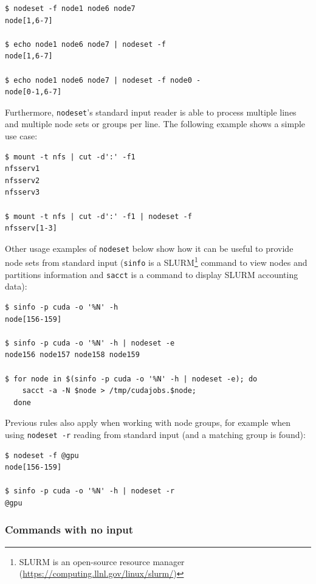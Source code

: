 \documentclass[english,a4paper]{csuserguide}
\newcommand{\nodeset}{\texttt{nodeset}\xspace}
\begin{document}
\begin{lstlisting}[breaklines=true, breakatwhitespace=true] 
$ nodeset -f node1 node6 node7
node[1,6-7]

$ echo node1 node6 node7 | nodeset -f
node[1,6-7]

$ echo node1 node6 node7 | nodeset -f node0 -
node[0-1,6-7]
\end{lstlisting}

\label{nodeset-stdin}
Furthermore, \nodeset's standard input reader is able to process multiple lines and multiple node sets or groups per line. The following example shows a simple use case:
\bigskip

\begin{lstlisting}[breaklines=true, breakatwhitespace=true] 
$ mount -t nfs | cut -d':' -f1
nfsserv1
nfsserv2
nfsserv3

$ mount -t nfs | cut -d':' -f1 | nodeset -f
nfsserv[1-3]
\end{lstlisting}


Other usage examples of \nodeset below show how it can be useful to provide node sets from standard input (\verb+sinfo+ is a SLURM\footnote{SLURM is an open-source resource manager (\url{https://computing.llnl.gov/linux/slurm/})} command to view nodes and partitions information and \verb+sacct+ is a command to display SLURM accounting data):
\bigskip

\begin{lstlisting}[breaklines=true, breakatwhitespace=true] 
$ sinfo -p cuda -o '%N' -h
node[156-159]

$ sinfo -p cuda -o '%N' -h | nodeset -e
node156 node157 node158 node159

$ for node in $(sinfo -p cuda -o '%N' -h | nodeset -e); do
	sacct -a -N $node > /tmp/cudajobs.$node;
  done

\end{lstlisting}

Previous rules also apply when working with node groups, for example when using \verb+nodeset -r+ reading from standard input (and a matching group is found):
\medskip
\begin{lstlisting}[breaklines=true, breakatwhitespace=true] 
$ nodeset -f @gpu
node[156-159]

$ sinfo -p cuda -o '%N' -h | nodeset -r
@gpu
\end{lstlisting}


\subsubsection{Commands with no input}
\end{document}
